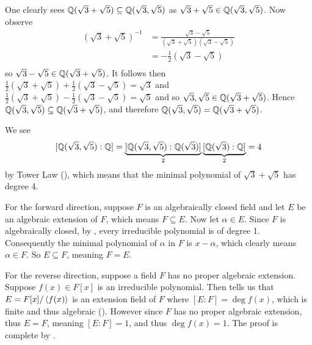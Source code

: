 \begin{questions}
    \item \begin{partquestions}{\roman*}
        \item One clearly sees $\mathbb{Q}(\sqrt3 + \sqrt5) \subseteq \mathbb{Q}(\sqrt3, \sqrt5)$ as $\sqrt3 + \sqrt5 \in \mathbb{Q}(\sqrt3, \sqrt5)$. Now observe
        \begin{align*}
            \left(\sqrt3+\sqrt5\right)^{-1} &= \frac{\sqrt3-\sqrt5}{\left(\sqrt3+\sqrt5\right)\left(\sqrt3-\sqrt5\right)}\\
            &= -\frac12\left(\sqrt3-\sqrt5\right)\\
        \end{align*}
        so $\sqrt3-\sqrt5 \in \mathbb{Q}(\sqrt3 + \sqrt5)$. It follows then $\frac12\left(\sqrt3 + \sqrt5\right) + \frac12\left(\sqrt3 - \sqrt5\right) = \sqrt3$ and $\frac12\left(\sqrt3 + \sqrt5\right) - \frac12\left(\sqrt3 - \sqrt5\right) = \sqrt5$ and so $\sqrt3,\sqrt5\in\mathbb{Q}(\sqrt3+\sqrt5)$. Hence $\mathbb{Q}(\sqrt3,\sqrt5)\subseteq\mathbb{Q}(\sqrt3+\sqrt5)$, and therefore $\mathbb{Q}(\sqrt3, \sqrt5) = \mathbb{Q}(\sqrt3 + \sqrt5)$.

        \item We see
        \[
            [\mathbb{Q}(\sqrt3, \sqrt5): \mathbb{Q}] = \underbrace{[\mathbb{Q}(\sqrt3, \sqrt5): \mathbb{Q}(\sqrt3)]}_2\underbrace{[\mathbb{Q}(\sqrt3):\mathbb{Q}]}_2 = 4
        \]
        by Tower Law (), which means that the minimal polynomial of $\sqrt3+\sqrt5$ has degree 4.
    \end{partquestions}

    \item For the forward direction, suppose $F$ is an algebraically closed field and let $E$ be an algebraic extension of $F$, which means $F \subseteq E$. Now let $\alpha \in E$. Since $F$ is algebraically closed, by , every irreducible polynomial is of degree 1. Consequently the minimal polynomial of $\alpha$ in $F$ is $x - \alpha$, which clearly means $\alpha \in F$. So $E \subseteq F$, meaning $F = E$.

    For the reverse direction, suppose a field $F$ has no proper algebraic extension. Suppose $f(x) \in F[x]$ is an irreducible polynomial. Then  tells us that $E = F[x]/\left\langle f(x)\right\rangle$ is an extension field of $F$ where $[E:F] = \deg f(x)$, which is finite and thus algebraic (). However since $F$ has no proper algebraic extension, thus $E = F$, meaning $[E:F] = 1$, and thus $\deg f(x) = 1$. The proof is complete by .
\end{questions}

